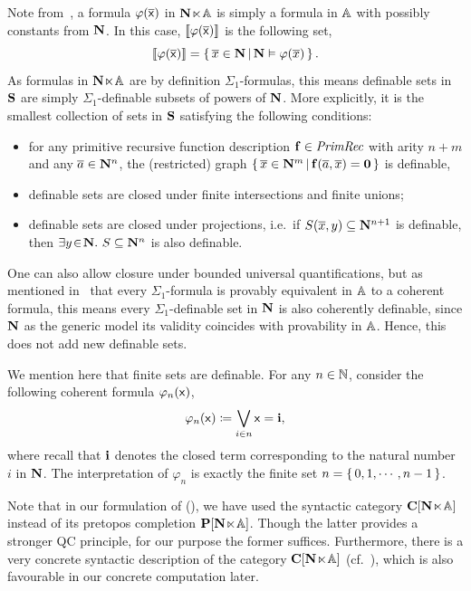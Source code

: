 \begin{example}\label{exa:definablesetsinA}
  Note from~, a formula $\varphi(\overline{\mathsf{x}})$ in $\mathbf N\hspace{-.4ex}\ltimes\hspace{-.4ex}\mathbb{A}$ is simply a formula in $\mathbb{A}$ with possibly constants from $\mathbf N$. In this case, $\llbracket\varphi(\overline{\mathsf{x}})\rrbracket$ is the following set,
  \[ \llbracket\varphi(\overline{\mathsf{x}})\rrbracket = \left\{\,\overline{x}\in\mathbf N\,\middle|\,\mathbf N \vDash \varphi(\overline{x})\,\right\}. \]
  As formulas in $\mathbf N\hspace{-.4ex}\ltimes\hspace{-.4ex}\mathbb{A}$ are by definition $\Sigma_1$-formulas, this means definable sets in $\mathbf{S}$ are simply $\Sigma_1$-definable subsets of powers of $\mathbf N$. More explicitly, it is the smallest collection of sets in $\mathbf{S}$ satisfying the following conditions:
  \begin{itemize}
    \item for any primitive recursive function description $\mathbf{f} \in \emph{PrimRec}$ with arity $n+m$ and any $\overline{a} \in \mathbf N^n$, the (restricted) graph $\left\{\,\overline{x}\in\mathbf N^m\,\middle|\,\mathbf{f}(\overline{a},\overline{x}) = \mathbf{0}\,\right\}$ is definable,
    \item definable sets are closed under finite intersections and finite unions;
    \item definable sets are closed under projections, i.e.\ if $S(\overline{x},y) \subseteq \mathbf N^{n+1}$ is definable, then $\exists y\!\in\!\mathbf N.\  S \subseteq \mathbf N^n$ is also definable.
  \end{itemize}
  One can also allow closure under bounded universal quantifications, but as mentioned in~ that every $\Sigma_1$-formula is provably equivalent in $\mathbb{A}$ to a coherent formula, this means every $\Sigma_1$-definable set in $\mathbf N$ is also coherently definable, since $\mathbf N$ as the generic model its validity coincides with provability in $\mathbb{A}$. Hence, this does not add new definable sets.
\end{example}

\begin{example}\label{exa:finitesetsdefinable}
  We mention here that finite sets are definable. For any $n\in\mathbb{N}$, consider the following coherent formula $\varphi_n(\mathsf{x})$,
  \[ \varphi_n(\mathsf{x}) \coloneq \bigvee_{i\in n} \mathsf{x} = \mathbf{i}, \]
  where recall that $\mathbf{i}$ denotes the closed term corresponding to the natural number $i$ in $\mathbf N$. The interpretation of $\varphi_n$ is exactly the finite set $n = \{\,0,1,\cdots,n-1\,\}$.
\end{example}

\begin{remark}
  Note that in our formulation of (\AxiomSQCA), we have used the syntactic category $\mathbf{C}[\mathbf N\hspace{-.4ex}\ltimes\hspace{-.4ex}\mathbb{A}]$ instead of its pretopos completion $\mathbf{P}[\mathbf N\hspace{-.4ex}\ltimes\hspace{-.4ex}\mathbb{A}]$. Though the latter provides a stronger \gls{QC} principle, for our purpose the former suffices. Furthermore, there is a very concrete syntactic description of the category $\mathbf{C}[\mathbf N\hspace{-.4ex}\ltimes\hspace{-.4ex}\mathbb{A}]$ (cf.~), which is also favourable in our concrete computation later.
\end{remark}

